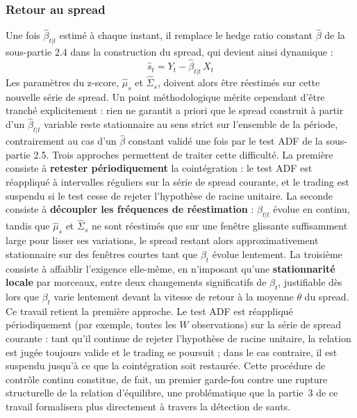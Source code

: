 \documentclass{article}
\begin{document}
\subsubsection*{Retour au spread}
Une fois $\hat\beta_{t|t}$ estimé à chaque instant, il remplace le hedge ratio constant $\hat\beta$ de la sous-partie 2.4 dans la construction du spread, qui devient ainsi dynamique :
\begin{equation}
\hat{s}_t = Y_t - \hat\beta_{t|t}\, X_t
\end{equation}
Les paramètres du z-score, $\hat\mu_s$ et $\hat{\Sigma}_s$, doivent alors être réestimés sur cette nouvelle série de spread. Un point méthodologique mérite cependant d'être tranché explicitement : rien ne garantit a priori que le spread construit à partir d'un $\hat\beta_{t|t}$ variable reste stationnaire au sens strict sur l'ensemble de la période, contrairement au cas d'un $\hat\beta$ constant validé une fois par le test ADF de la sous-partie 2.5. Trois approches permettent de traiter cette difficulté. La première consiste à \textbf{retester périodiquement} la cointégration : le test ADF est réappliqué à intervalles réguliers sur la série de spread courante, et le trading est suspendu si le test cesse de rejeter l'hypothèse de racine unitaire. La seconde consiste à \textbf{découpler les fréquences de réestimation} : $\hat\beta_{t|t}$ évolue en continu, tandis que $\hat\mu_s$ et $\hat{\Sigma}_s$ ne sont réestimés que sur une fenêtre glissante suffisamment large pour lisser ses variations, le spread restant alors approximativement stationnaire sur des fenêtres courtes tant que $\beta_t$ évolue lentement. La troisième consiste à affaiblir l'exigence elle-même, en n'imposant qu'une \textbf{stationnarité locale} par morceaux, entre deux changements significatifs de $\beta_t$, justifiable dès lors que $\beta_t$ varie lentement devant la vitesse de retour à la moyenne $\theta$ du spread.
Ce travail retient la première approche. Le test ADF est réappliqué périodiquement (par exemple, toutes les $W$ observations) sur la série de spread courante : tant qu'il continue de rejeter l'hypothèse de racine unitaire, la relation est jugée toujours valide et le trading se poursuit ; dans le cas contraire, il est suspendu jusqu'à ce que la cointégration soit restaurée. Cette procédure de contrôle continu constitue, de fait, un premier garde-fou contre une rupture structurelle de la relation d'équilibre, une problématique que la partie~3 de ce travail formalisera plus directement à travers la détection de sauts.
\end{document}
